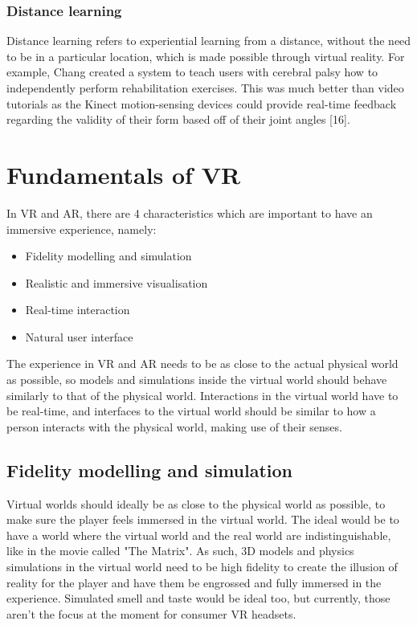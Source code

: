 \documentclass[11pt]{article}
\makeatletter
\newcommand{\cslcitation}[2]
 {\protect\hyper@linkstart{cite}{citeproc_bib_item_#1}#2\hyper@linkend}
\makeatother
\begin{document}
\subsubsection{Distance learning}
\label{sec:orga21b660}
Distance learning refers to experiential learning from a distance, without the need to be in a particular location, which is made possible through virtual reality. For example, Chang created a system to teach users with cerebral palsy how to independently perform rehabilitation exercises. This was much better than video tutorials as the Kinect motion-sensing devices could provide real-time feedback regarding the validity of their form based off of their joint angles \cslcitation{16}{[16]}.

 \newpage
\section{Fundamentals of VR}
\label{sec:org9c82a15}
In VR and AR, there are 4 characteristics which are important to have an immersive experience, namely:
\begin{itemize}
\item Fidelity modelling and simulation
\item Realistic and immersive visualisation
\item Real-time interaction
\item Natural user interface
\end{itemize}

The experience in VR and AR needs to be as close to the actual physical world as possible, so models and simulations inside the virtual world should behave similarly to that of the physical world. Interactions in the virtual world have to be real-time, and interfaces to the virtual world should be similar to how a person interacts with the physical world, making use of their senses.
\subsection{Fidelity modelling and simulation}
\label{sec:org02a33f9}
Virtual worlds should ideally be as close to the physical world as possible, to make sure the player feels immersed in the virtual world. The ideal would be to have a world where the virtual world and the real world are indistinguishable, like in the movie called "The Matrix". As such, 3D models and physics simulations in the virtual world need to be high fidelity to create the illusion of reality for the player and have them be engrossed and fully immersed in the experience. Simulated smell and taste would be ideal too, but currently, those aren't the focus at the moment for consumer VR headsets.
\end{document}
